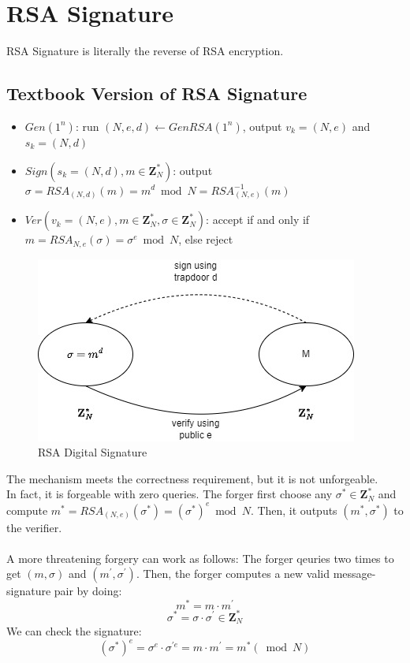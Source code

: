 \documentclass{scribe}
\begin{document}
\section{RSA Signature}
RSA Signature is literally the reverse of RSA encryption.
\subsection{Textbook Version of RSA Signature}
\begin{itemize}
    \item $Gen(1^n)$: run $(N,e,d) \leftarrow GenRSA(1^n)$, output $v_k = (N,e)$ and $s_k = (N,d)$
    \item $Sign(s_k=(N,d), m \in \mathbf{Z}_N^*)$: output $\sigma = RSA_(N,d)(m) = m^d \bmod N = RSA_{(N,e)}^{-1}(m)$
    \item $Ver(v_k=(N,e), m \in \mathbf{Z}_N^*, \sigma \in \mathbf{Z}_N^*)$: accept if and only if $m=RSA_{N,e}(\sigma) = \sigma^e \bmod N$, else reject
\end{itemize}
\begin{figure}[H]
    \centering
    \includegraphics[scale=0.5]{rsa_signature.jpg}
    \caption{RSA Digital Signature}
\end{figure}
The mechanism meets the correctness requirement, but it is not unforgeable. 
\\
In fact, it is forgeable with zero queries. The forger first choose any $\sigma^* \in \mathbf{Z}_N^*$ and compute $m^* = RSA_{(N,e)}(\sigma^*) = (\sigma^*)^e \bmod N$. Then, it outputs $(m^*, \sigma^*)$ to the verifier.
\\\\
A more threatening forgery can work as follows:
The forger qeuries two times to get $(m, \sigma)$ and $(m^{'},\sigma^{'})$.
Then, the forger computes a new valid message-signature pair by doing:
\[ m^* = m \cdot m^{'} \]
\[\sigma^{*} = \sigma \cdot \sigma^{'} \in \mathbf{Z}_N^*\]
We can check the signature:
\[(\sigma^{*})^e = \sigma^e \cdot \sigma^{'e} = m \cdot m^{'} = m^{*} (\bmod N)\]
\vspace{5mm}
\end{document}
